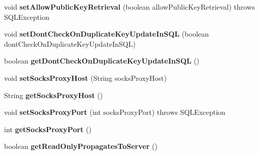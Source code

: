 \begin{DoxyCompactItemize}
void {\bfseries set\+Allow\+Public\+Key\+Retrieval} (boolean allow\+Public\+Key\+Retrieval)  throws S\+Q\+L\+Exception
\item 
\mbox{\label{interfacecom_1_1mysql_1_1jdbc_1_1_connection_properties_ac79f2a6cd193f8ffaf193cddc8ca5f7f}} 
void {\bfseries set\+Dont\+Check\+On\+Duplicate\+Key\+Update\+In\+S\+QL} (boolean dont\+Check\+On\+Duplicate\+Key\+Update\+In\+S\+QL)
\item 
\mbox{\label{interfacecom_1_1mysql_1_1jdbc_1_1_connection_properties_aa04937290ccb6a96ad3aac4b072d030f}} 
boolean {\bfseries get\+Dont\+Check\+On\+Duplicate\+Key\+Update\+In\+S\+QL} ()
\item 
\mbox{\label{interfacecom_1_1mysql_1_1jdbc_1_1_connection_properties_af54cb30118207b15de5af8414cd8c84d}} 
void {\bfseries set\+Socks\+Proxy\+Host} (String socks\+Proxy\+Host)
\item 
\mbox{\label{interfacecom_1_1mysql_1_1jdbc_1_1_connection_properties_a05bcbb7cb3d6cdf48d18074043585dd7}} 
String {\bfseries get\+Socks\+Proxy\+Host} ()
\item 
\mbox{\label{interfacecom_1_1mysql_1_1jdbc_1_1_connection_properties_a38dd90d8aae89760c1ceb8ed53665532}} 
void {\bfseries set\+Socks\+Proxy\+Port} (int socks\+Proxy\+Port)  throws S\+Q\+L\+Exception
\item 
\mbox{\label{interfacecom_1_1mysql_1_1jdbc_1_1_connection_properties_ac6eb2da72296ac081e9274e5df72d1e1}} 
int {\bfseries get\+Socks\+Proxy\+Port} ()
\item 
\mbox{\label{interfacecom_1_1mysql_1_1jdbc_1_1_connection_properties_a71843441475387c176334e5a7ca0060f}} 
boolean {\bfseries get\+Read\+Only\+Propagates\+To\+Server} ()
\item 
\mbox{\label{interfacecom_1_1mysql_1_1jdbc_1_1_connection_properties_acd6c1c3c638b3c3db00a84f871be0fee}} 

\end{DoxyCompactItemize}
